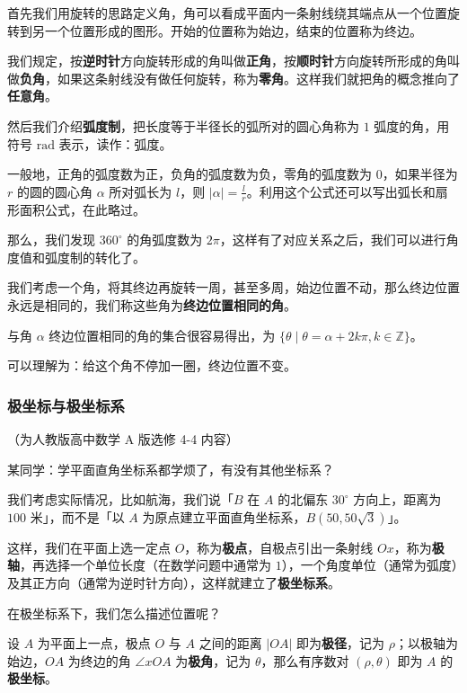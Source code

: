 首先我们用旋转的思路定义角，角可以看成平面内一条射线绕其端点从一个位置旋转到另一个位置形成的图形。开始的位置称为始边，结束的位置称为终边。

我们规定，按\textbf{逆时针}方向旋转形成的角叫做\textbf{正角}，按\textbf{顺时针}方向旋转所形成的角叫做\textbf{负角}，如果这条射线没有做任何旋转，称为\textbf{零角}。这样我们就把角的概念推向了\textbf{任意角}。

然后我们介绍\textbf{弧度制}，把长度等于半径长的弧所对的圆心角称为 $1$ 弧度的角，用符号 $\text{rad}$ 表示，读作：弧度。

一般地，正角的弧度数为正，负角的弧度数为负，零角的弧度数为 $0$，如果半径为 $r$ 的圆的圆心角 $\alpha$ 所对弧长为 $l$，则 $|\alpha|=\frac{l}{r}$。利用这个公式还可以写出弧长和扇形面积公式，在此略过。

那么，我们发现 $360^\circ$ 的角弧度数为 $2\pi$，这样有了对应关系之后，我们可以进行角度值和弧度制的转化了。

我们考虑一个角，将其终边再旋转一周，甚至多周，始边位置不动，那么终边位置永远是相同的，我们称这些角为\textbf{终边位置相同的角}。

与角 $\alpha$ 终边位置相同的角的集合很容易得出，为 $\{\theta\mid \theta=\alpha+2k\pi,k\in \mathbb{Z}\}$。

可以理解为：给这个角不停加一圈，终边位置不变。

\subsubsection{极坐标与极坐标系}

（为人教版高中数学 A 版选修 4-4 内容）

\begin{QUOTE}{}{}
某同学：学平面直角坐标系都学烦了，有没有其他坐标系？
\end{QUOTE}

我们考虑实际情况，比如航海，我们说「$B$ 在 $A$ 的北偏东 $30^\circ$ 方向上，距离为 $100$ 米」，而不是「以 $A$ 为原点建立平面直角坐标系，$B(50,50\sqrt 3)$」。

这样，我们在平面上选一定点 $O$，称为\textbf{极点}，自极点引出一条射线 $Ox$，称为\textbf{极轴}，再选择一个单位长度（在数学问题中通常为 $1$），一个角度单位（通常为弧度）及其正方向（通常为逆时针方向），这样就建立了\textbf{极坐标系}。

在极坐标系下，我们怎么描述位置呢？

设 $A$ 为平面上一点，极点 $O$ 与 $A$ 之间的距离 $|OA|$ 即为\textbf{极径}，记为 $\rho$；以极轴为始边，$OA$ 为终边的角 $\angle xOA$ 为\textbf{极角}，记为 $\theta$，那么有序数对 $(\rho,\theta)$ 即为 $A$ 的\textbf{极坐标}。

